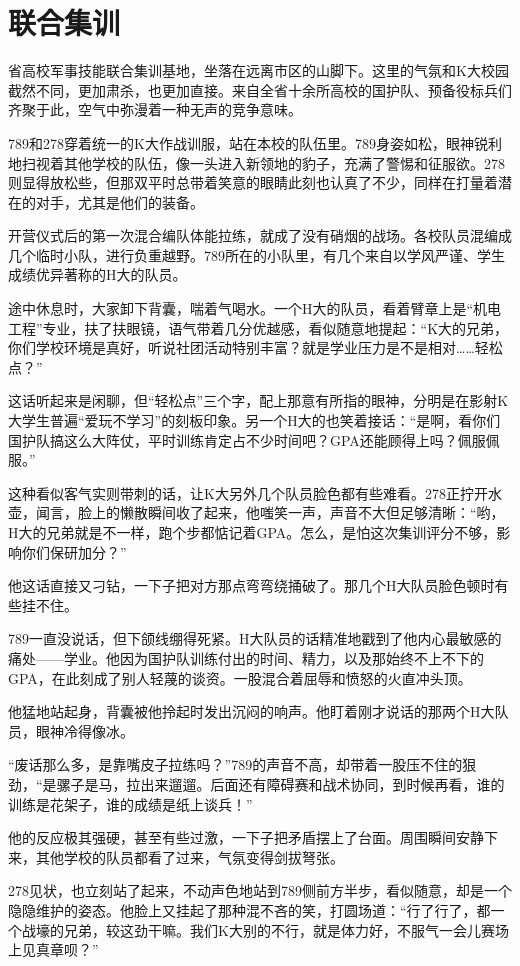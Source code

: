 \documentclass[a4paper]{book}
\begin{document}
\section{联合集训}
\songti{}
省高校军事技能联合集训基地，坐落在远离市区的山脚下。这里的气氛和K大校园截然不同，更加肃杀，也更加直接。来自全省十余所高校的国护队、预备役标兵们齐聚于此，空气中弥漫着一种无声的竞争意味。

789和278穿着统一的K大作战训服，站在本校的队伍里。789身姿如松，眼神锐利地扫视着其他学校的队伍，像一头进入新领地的豹子，充满了警惕和征服欲。278则显得放松些，但那双平时总带着笑意的眼睛此刻也认真了不少，同样在打量着潜在的对手，尤其是他们的装备。

开营仪式后的第一次混合编队体能拉练，就成了没有硝烟的战场。各校队员混编成几个临时小队，进行负重越野。789所在的小队里，有几个来自以学风严谨、学生成绩优异著称的H大的队员。

途中休息时，大家卸下背囊，喘着气喝水。一个H大的队员，看着臂章上是“机电工程”专业，扶了扶眼镜，语气带着几分优越感，看似随意地提起：“K大的兄弟，你们学校环境是真好，听说社团活动特别丰富？就是学业压力是不是相对……轻松点？”

这话听起来是闲聊，但“轻松点”三个字，配上那意有所指的眼神，分明是在影射K大学生普遍“爱玩不学习”的刻板印象。另一个H大的也笑着接话：“是啊，看你们国护队搞这么大阵仗，平时训练肯定占不少时间吧？GPA还能顾得上吗？佩服佩服。”

这种看似客气实则带刺的话，让K大另外几个队员脸色都有些难看。278正拧开水壶，闻言，脸上的懒散瞬间收了起来，他嗤笑一声，声音不大但足够清晰：“哟，H大的兄弟就是不一样，跑个步都惦记着GPA。怎么，是怕这次集训评分不够，影响你们保研加分？”

他这话直接又刁钻，一下子把对方那点弯弯绕捅破了。那几个H大队员脸色顿时有些挂不住。

789一直没说话，但下颌线绷得死紧。H大队员的话精准地戳到了他内心最敏感的痛处——学业。他因为国护队训练付出的时间、精力，以及那始终不上不下的GPA，在此刻成了别人轻蔑的谈资。一股混合着屈辱和愤怒的火直冲头顶。

他猛地站起身，背囊被他拎起时发出沉闷的响声。他盯着刚才说话的那两个H大队员，眼神冷得像冰。

“废话那么多，是靠嘴皮子拉练吗？”789的声音不高，却带着一股压不住的狠劲，“是骡子是马，拉出来遛遛。后面还有障碍赛和战术协同，到时候再看，谁的训练是花架子，谁的成绩是纸上谈兵！”

他的反应极其强硬，甚至有些过激，一下子把矛盾摆上了台面。周围瞬间安静下来，其他学校的队员都看了过来，气氛变得剑拔弩张。

278见状，也立刻站了起来，不动声色地站到789侧前方半步，看似随意，却是一个隐隐维护的姿态。他脸上又挂起了那种混不吝的笑，打圆场道：“行了行了，都一个战壕的兄弟，较这劲干嘛。我们K大别的不行，就是体力好，不服气一会儿赛场上见真章呗？”
\end{document}
